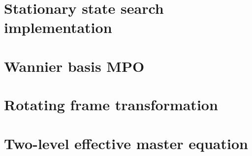 \documentclass[a4paper,oneside,12pt]{hwthesis}
\newcommand*{\chappath}{../../include/chapters}
\newcommand*{\refpath}{../../include/refs}
\begin{document}


\appendix
\chapter{\label{chp:mpostat}Stationary state search implementation}



\chapter{\label{chp:dimmpo}Wannier basis MPO}



\chapter{\label{chp:rotframe}Rotating frame transformation}



\chapter{\label{chp:adelim}Two-level effective master equation}





\end{document}
